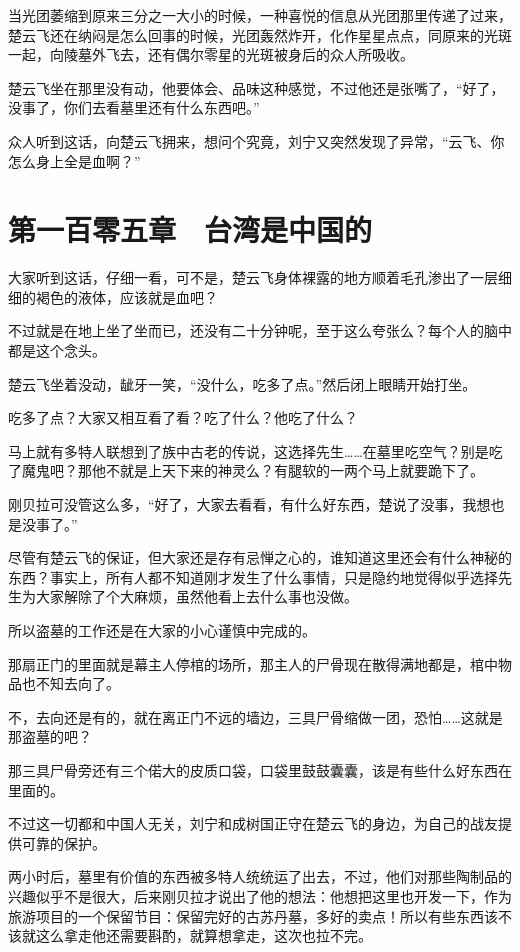 当光团萎缩到原来三分之一大小的时候，一种喜悦的信息从光团那里传递了过来，楚云飞还在纳闷是怎么回事的时候，光团轰然炸开，化作星星点点，同原来的光斑一起，向陵墓外飞去，还有偶尔零星的光斑被身后的众人所吸收。

楚云飞坐在那里没有动，他要体会、品味这种感觉，不过他还是张嘴了，“好了，没事了，你们去看墓里还有什么东西吧。”

众人听到这话，向楚云飞拥来，想问个究竟，刘宁又突然发现了异常，“云飞、你怎么身上全是血啊？”

\section{第一百零五章　台湾是中国的}

大家听到这话，仔细一看，可不是，楚云飞身体裸露的地方顺着毛孔渗出了一层细细的褐色的液体，应该就是血吧？

不过就是在地上坐了坐而已，还没有二十分钟呢，至于这么夸张么？每个人的脑中都是这个念头。

楚云飞坐着没动，龇牙一笑，“没什么，吃多了点。”然后闭上眼睛开始打坐。

吃多了点？大家又相互看了看？吃了什么？他吃了什么？

马上就有多特人联想到了族中古老的传说，这选择先生……在墓里吃空气？别是吃了魔鬼吧？那他不就是上天下来的神灵么？有腿软的一两个马上就要跪下了。

刚贝拉可没管这么多，“好了，大家去看看，有什么好东西，楚说了没事，我想也是没事了。”

尽管有楚云飞的保证，但大家还是存有忌惮之心的，谁知道这里还会有什么神秘的东西？事实上，所有人都不知道刚才发生了什么事情，只是隐约地觉得似乎选择先生为大家解除了个大麻烦，虽然他看上去什么事也没做。

所以盗墓的工作还是在大家的小心谨慎中完成的。

那扇正门的里面就是幕主人停棺的场所，那主人的尸骨现在散得满地都是，棺中物品也不知去向了。

不，去向还是有的，就在离正门不远的墙边，三具尸骨缩做一团，恐怕……这就是那盗墓的吧？

那三具尸骨旁还有三个偌大的皮质口袋，口袋里鼓鼓囊囊，该是有些什么好东西在里面的。

不过这一切都和中国人无关，刘宁和成树国正守在楚云飞的身边，为自己的战友提供可靠的保护。

两小时后，墓里有价值的东西被多特人统统运了出去，不过，他们对那些陶制品的兴趣似乎不是很大，后来刚贝拉才说出了他的想法：他想把这里也开发一下，作为旅游项目的一个保留节目：保留完好的古苏丹墓，多好的卖点！所以有些东西该不该就这么拿走他还需要斟酌，就算想拿走，这次也拉不完。

